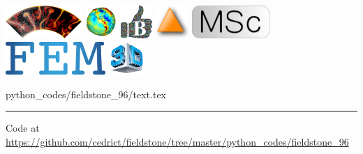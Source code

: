 \includegraphics[height=1.25cm]{images/pictograms/aspect_logo}
\includegraphics[height=1.25cm]{images/pictograms/gravity}
\includegraphics[height=1.25cm]{images/pictograms/benchmark}
\includegraphics[height=1.25cm]{images/pictograms/triangle}
\includegraphics[height=1.25cm]{images/pictograms/msc}
\includegraphics[height=1.25cm]{images/pictograms/FEM}
\includegraphics[height=1.25cm]{images/pictograms/3d}


\begin{flushright} {\tiny {\color{gray} python\_codes/fieldstone\_96/text.tex}} \end{flushright}



\par\noindent\rule{\textwidth}{0.4pt}

\begin{center}
Code at \url{https://github.com/cedrict/fieldstone/tree/master/python_codes/fieldstone_96}
\end{center}

